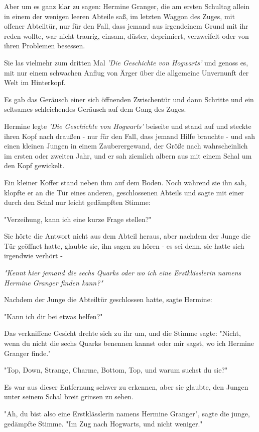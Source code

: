 {Aber um es ganz klar zu sagen: Hermine Granger, die am ersten Schultag allein in einem der wenigen leeren Abteile saß, im letzten Waggon des Zuges, mit offener Abteiltür, nur für den Fall, dass jemand aus irgendeinem Grund mit ihr reden wollte, war nicht traurig, einsam, düster, deprimiert, verzweifelt oder von ihren Problemen besessen.

Sie las vielmehr zum dritten Mal \emph{'Die Geschichte von Hogwarts'} und genoss es, mit nur einem schwachen Anflug von Ärger über die allgemeine Unvernunft der Welt im Hinterkopf.

Es gab das Geräusch einer sich öffnenden Zwischentür und dann Schritte und ein seltsames schleichendes Geräusch auf dem Gang des Zuges.

Hermine legte \emph{'Die Geschichte von Hogwarts'} beiseite und stand auf und steckte ihren Kopf nach draußen - nur für den Fall, dass jemand Hilfe brauchte - und sah einen kleinen Jungen in einem Zauberergewand, der Größe nach wahrscheinlich im ersten oder zweiten Jahr, und er sah ziemlich albern aus mit einem Schal um den Kopf gewickelt.

Ein kleiner Koffer stand neben ihm auf dem Boden. Noch während sie ihn sah, klopfte er an die Tür eines anderen, geschlossenen Abteils und sagte mit einer durch den Schal nur leicht gedämpften Stimme:

"Verzeihung, kann ich eine kurze Frage stellen?"

Sie hörte die Antwort nicht aus dem Abteil heraus, aber nachdem der Junge die Tür geöffnet hatte, glaubte sie, ihn sagen zu hören - es sei denn, sie hatte sich irgendwie verhört -

\emph{"Kennt hier jemand die sechs Quarks oder wo ich eine Erstklässlerin namens Hermine Granger finden kann?"}

Nachdem der Junge die Abteiltür geschlossen hatte, sagte Hermine:

"Kann ich dir bei etwas helfen?"

Das verkniffene Gesicht drehte sich zu ihr um, und die Stimme sagte: "Nicht, wenn du nicht die sechs Quarks benennen kannst oder mir sagst, wo ich Hermine Granger finde."

"Top, Down, Strange, Charme, Bottom, Top, und warum suchst du sie?"

Es war aus dieser Entfernung schwer zu erkennen, aber sie glaubte, den Jungen unter seinem Schal breit grinsen zu sehen.

"Ah, du bist also eine Erstklässlerin namens Hermine Granger", sagte die junge, gedämpfte Stimme. "Im Zug nach Hogwarts, und nicht weniger."

}
